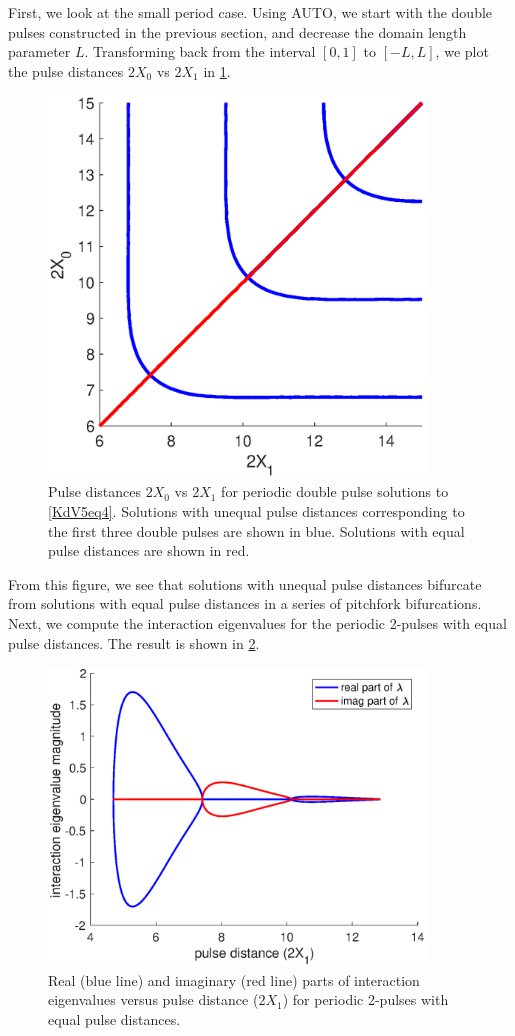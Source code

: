 \documentclass[thesis2.tex]{subfiles}
\begin{document}
First, we look at the small period case. Using AUTO, we start with the double pulses constructed in the previous section, and decrease the domain length parameter $L$. Transforming back from the interval $[0, 1]$ to $[-L, L]$, we plot the pulse distances $2 X_0$ vs $2 X_1$ in \cref{fig:periodicpitchfork}.
\begin{figure}
\includegraphics[width=10cm]{images/kdv5numerics/periodicpitchfork.eps}
\caption[Pulse distances of periodic multi-pulses in KdV5]{Pulse distances $2 X_0$ vs $2 X_1$ for periodic double pulse solutions to \cref{KdV5eq4}. Solutions with unequal pulse distances corresponding to the first three double pulses are shown in blue. Solutions with equal pulse distances are shown in red.}
\label{fig:periodicpitchfork}
\end{figure}
From this figure, we see that solutions with unequal pulse distances bifurcate from solutions with equal pulse distances in a series of pitchfork bifurcations. Next, we compute the interaction eigenvalues for the periodic 2-pulses with equal pulse distances. The result is shown in \cref{fig:periodicequaleigbif}.
\begin{figure}
\includegraphics[width=10cm]{images/kdv5numerics/periodicequaleigbif.eps}
\caption[Eigenvalue bifurcations for symmetric periodic double pulses in KdV5]{Real (blue line) and imaginary (red line) parts of interaction eigenvalues versus pulse distance ($2 X_1$) for periodic 2-pulses with equal pulse distances.}
\label{fig:periodicequaleigbif}
\end{figure}
\end{document}
